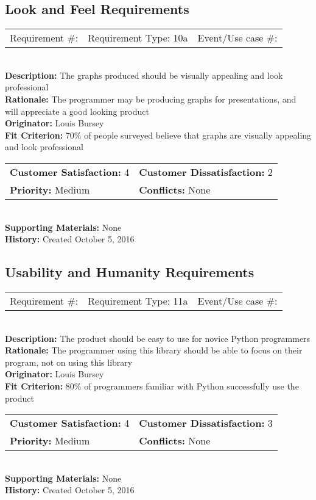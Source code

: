 \documentclass[12pt, titlepage]{article}
\begin{document}
\subsection{Look and Feel Requirements}
%
%
\begin{reqbox}
\begin{tabular}{ccc}
Requirement \#: & Requirement Type: 10a & Event/Use case \#: \\
\end{tabular} \\
\textbf{Description:} The graphs produced should be visually appealing and look professional \\
\textbf{Rationale:} The programmer may be producing graphs for presentations, and will appreciate a good looking product \\
\textbf{Originator:} Louis Bursey\\
\textbf{Fit Criterion:} 70\% of people surveyed believe that graphs are visually appealing and look professional  \\
\begin{tabular}{ll}
\textbf{Customer Satisfaction:} 4 & \textbf{Customer Dissatisfaction:} 2 \\
\textbf{Priority:} Medium & \textbf{Conflicts:} None\\
\end{tabular} \\
\textbf{Supporting Materials:} None \\
\textbf{History:} Created October 5, 2016
\end{reqbox}
%
%
\subsection{Usability and Humanity Requirements}

%
%
\begin{reqbox}
\begin{tabular}{ccc}
Requirement \#: & Requirement Type: 11a & Event/Use case \#: \\
\end{tabular} \\
\textbf{Description:} The product should be easy to use for novice Python programmers \\
\textbf{Rationale:} The programmer using this library should be able to focus on their program, not on using this library \\
\textbf{Originator:} Louis Bursey\\
\textbf{Fit Criterion:} 80\% of programmers familiar with Python successfully use the product  \\
\begin{tabular}{ll}
\textbf{Customer Satisfaction:} 4 & \textbf{Customer Dissatisfaction:} 3 \\
\textbf{Priority:} Medium & \textbf{Conflicts:} None\\
\end{tabular} \\
\textbf{Supporting Materials:} None \\
\textbf{History:} Created October 5, 2016
\end{reqbox}
\end{document}
